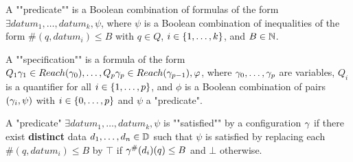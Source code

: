 \begin{definition}
	A ""predicate"" is a Boolean combination of formulas of the form $\exists datum_1, \ldots, datum_k, \psi$, where $\psi$ is a Boolean combination of inequalities of the form $\#(q,datum_i) \leq B$ with $q\in Q$, $i \in \{1,\dots,k\}$, and $B \in \mathbb{N}$.
	
	A ""specification"" is a formula of the form $Q_1 \gamma_1  \in Reach(\gamma_0), \ldots, Q_p \gamma_p \in Reach(\gamma_{p-1}), \varphi$, where $\gamma_0, \ldots, \gamma_{p}$ are variables, $Q_i$ is a quantifier for all $i \in \{1,\dots,p\}$, and $\phi$ is a Boolean combination of pairs $(\gamma_i, \psi)$ with $i \in \{0,\dots,p\}$ and $\psi$ a "predicate".
	
\end{definition}

A "predicate" $\exists datum_1, \ldots, datum_k, \psi$ is ""satisfied"" by a configuration $\gamma$ if there exist \textbf{distinct} data $d_1, \ldots, d_n \in \mathbb{D}$ such that $\psi$ is satisfied by replacing each $\#(q,datum_i) \leq B$ by $\top$ if $\gamma^{\#}(d_i)(q) \leq B$ and $\bot$ otherwise.
